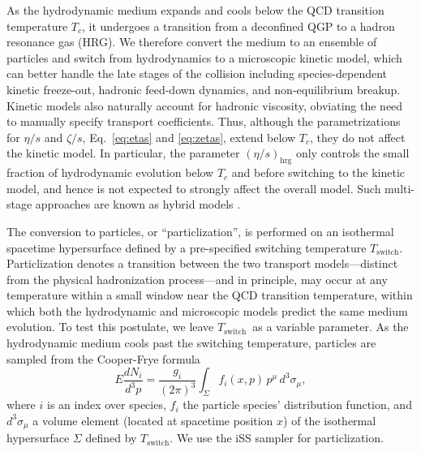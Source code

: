 \documentclass[aps,prc,reprint,amsmath,nofootinbib,noeprint]{revtex4-1}
\begin{document}
As the hydrodynamic medium expands and cools below the QCD transition temperature $T_c$, it undergoes a transition from a deconfined QGP to a hadron resonance gas (HRG).
We therefore convert the medium to an ensemble of particles and switch from hydrodynamics to a microscopic kinetic model, which can better handle the late stages of the collision including species-dependent kinetic freeze-out, hadronic feed-down dynamics, and non-equilibrium breakup.
Kinetic models also naturally account for hadronic viscosity, obviating the need to manually specify transport coefficients.
Thus, although the parametrizations for $\eta/s$ and $\zeta/s$, Eq.~\eqref{eq:etas} and \eqref{eq:zetas}, extend below $T_c$, they do not affect the kinetic model.
In particular, the parameter $(\eta/s)_\text{hrg}$ only controls the small fraction of hydrodynamic evolution below $T_c$ and before switching to the kinetic model, and hence is not expected to strongly affect the overall model.
Such multi-stage approaches are known as hybrid models \cite{Bass:2000ib, Nonaka:2006yn, Petersen:2008dd}.

\newcommand{\Tsw}{$T_\text{switch}$}

The conversion to particles, or ``particlization'', is performed on an isothermal spacetime hypersurface defined by a pre-specified switching temperature \Tsw.
Particlization denotes a transition between the two transport models---distinct from the physical hadronization process---and in principle, may occur at any temperature within a small window near the QCD transition temperature, within which both the hydrodynamic and microscopic models predict the same medium evolution.
To test this postulate, we leave \Tsw\ as a variable parameter.
As the hydrodynamic medium cools past the switching temperature, particles are sampled from the Cooper-Frye formula \cite{Cooper:1974mv}
\begin{equation}
  E \frac{dN_i}{d^3p} =
    \frac{g_i}{(2\pi)^3} \int_\Sigma f_i(x,p) \, p^\mu \, d^3\sigma_\mu,
  \label{eq:cooper_frye}
\end{equation}
where $i$ is an index over species, $f_i$ the particle species' distribution function, and $d^3\sigma_\mu$ a volume element (located at spacetime position $x$) of the isothermal hypersurface $\Sigma$ defined by \Tsw.
We use the iSS sampler \cite{Shen:2014vra, Qiu:2013wca} for particlization.

\newcommand{\df}{\delta f}
\end{document}
